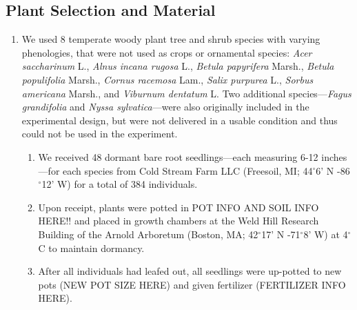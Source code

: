 \documentclass{article}\usepackage[]{graphicx}\usepackage[]{color}
\begin{document}
\subsection*{Plant Selection and Material}
\begin{enumerate}
\item We used 8 temperate woody plant tree and shrub species with varying phenologies, that were not used as crops or ornamental species: \textit{Acer saccharinum} L., \textit{Alnus incana rugosa} L., \textit{Betula papyrifera} Marsh., \textit{Betula populifolia} Marsh., \textit{Cornus racemosa} Lam., \textit{Salix purpurea} L., \textit{Sorbus americana} Marsh., and \textit{Viburnum dentatum} L. Two additional species---\textit{Fagus grandifolia} and \textit{Nyssa sylvatica}---were also originally included in the experimental design, but were not delivered in a usable condition and thus could not be used in the experiment.
  \begin{enumerate}
  \item We received 48 dormant bare root seedlings---each measuring 6-12 inches---for each species from Cold Stream Farm LLC (Freesoil, MI; 44$^{\circ}$6' N -86$^{\circ}$12' W) for a total of 384 individuals.
  \item Upon receipt, plants were potted in POT INFO AND SOIL INFO HERE!! and placed in growth chambers at the Weld Hill Research Building of the Arnold Arboretum (Boston, MA; 42$^{\circ}$17' N -71$^{\circ}$8' W) at 4$^{\circ}$C to maintain dormancy.
  \item After all individuals had leafed out, all seedlings were up-potted to new pots (NEW POT SIZE HERE) and given fertilizer (FERTILIZER INFO HERE).
  \end{enumerate}
\end{enumerate}
\end{document}
